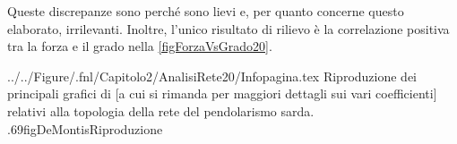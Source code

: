         Queste discrepanze sono perché sono lievi e, per quanto concerne questo elaborato, irrilevanti. Inoltre, l'unico risultato di rilievo è la correlazione positiva tra la forza e il grado nella \cref{figForzaVsGrado20}.

            {../../Figure/.fnl/Capitolo2/AnalisiRete20/Infopagina.tex}
            {Riproduzione dei principali grafici di \protect\cite{DeMontis2007} [a cui si rimanda per maggiori dettagli sui vari coefficienti] relativi alla topologia della rete del pendolarismo sarda.}
            {.69\linewidth}{figDeMontisRiproduzione}
